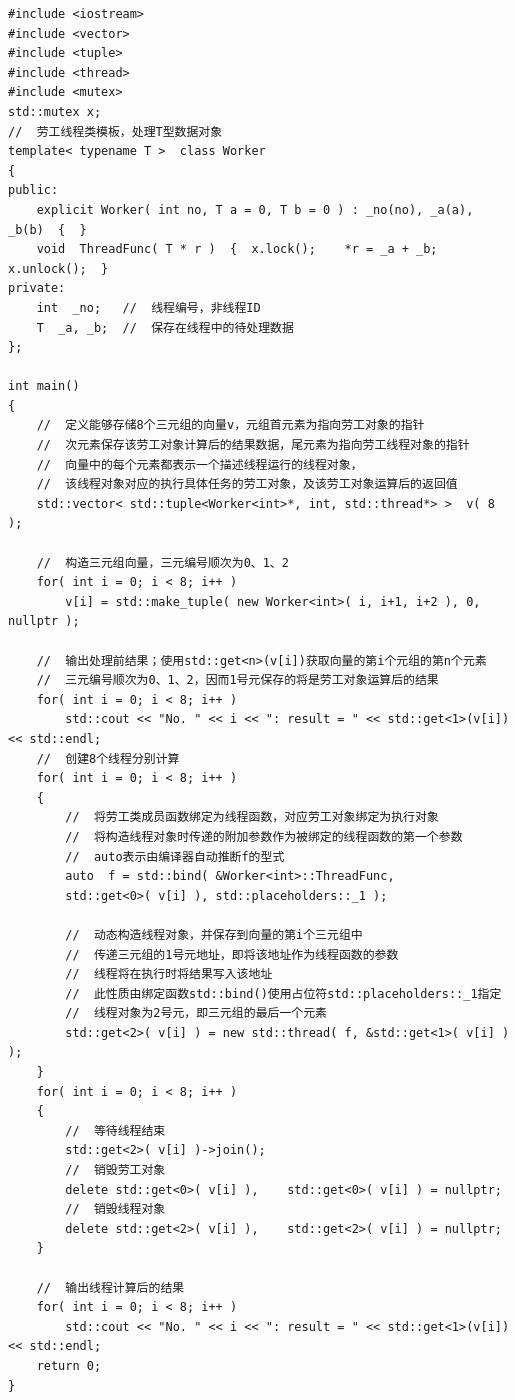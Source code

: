 \documentclass[UTF8,a4paper,12pt]{ctexbook}
\begin{document}
			\begin{lstlisting}
#include <iostream>
#include <vector>
#include <tuple>
#include <thread>
#include <mutex>
std::mutex x;
//  劳工线程类模板，处理T型数据对象
template< typename T >  class Worker
{
public:
	explicit Worker( int no, T a = 0, T b = 0 ) : _no(no), _a(a), _b(b)  {  }
	void  ThreadFunc( T * r )  {  x.lock();    *r = _a + _b;    x.unlock();  }
private:
	int  _no;	//  线程编号，非线程ID
	T  _a, _b;	//  保存在线程中的待处理数据
};
		
int main()
{
	//  定义能够存储8个三元组的向量v，元组首元素为指向劳工对象的指针
	//  次元素保存该劳工对象计算后的结果数据，尾元素为指向劳工线程对象的指针
	//  向量中的每个元素都表示一个描述线程运行的线程对象，
	//  该线程对象对应的执行具体任务的劳工对象，及该劳工对象运算后的返回值
	std::vector< std::tuple<Worker<int>*, int, std::thread*> >  v( 8 );
			
	//  构造三元组向量，三元编号顺次为0、1、2
	for( int i = 0; i < 8; i++ )
		v[i] = std::make_tuple( new Worker<int>( i, i+1, i+2 ), 0, nullptr );
			
	//  输出处理前结果；使用std::get<n>(v[i])获取向量的第i个元组的第n个元素
	//  三元编号顺次为0、1、2，因而1号元保存的将是劳工对象运算后的结果
	for( int i = 0; i < 8; i++ )
		std::cout << "No. " << i << ": result = " << std::get<1>(v[i]) << std::endl;
	//  创建8个线程分别计算
	for( int i = 0; i < 8; i++ )
	{
		//  将劳工类成员函数绑定为线程函数，对应劳工对象绑定为执行对象
		//  将构造线程对象时传递的附加参数作为被绑定的线程函数的第一个参数
		//  auto表示由编译器自动推断f的型式
		auto  f = std::bind( &Worker<int>::ThreadFunc,
		std::get<0>( v[i] ), std::placeholders::_1 );
				
		//  动态构造线程对象，并保存到向量的第i个三元组中
		//  传递三元组的1号元地址，即将该地址作为线程函数的参数
		//  线程将在执行时将结果写入该地址
		//  此性质由绑定函数std::bind()使用占位符std::placeholders::_1指定
		//  线程对象为2号元，即三元组的最后一个元素
		std::get<2>( v[i] ) = new std::thread( f, &std::get<1>( v[i] ) );
	}
	for( int i = 0; i < 8; i++ )
	{
		//  等待线程结束
		std::get<2>( v[i] )->join(); 
		//  销毁劳工对象
		delete std::get<0>( v[i] ),    std::get<0>( v[i] ) = nullptr;
		//  销毁线程对象
		delete std::get<2>( v[i] ),    std::get<2>( v[i] ) = nullptr;
	}
			
	//  输出线程计算后的结果
	for( int i = 0; i < 8; i++ )
		std::cout << "No. " << i << ": result = " << std::get<1>(v[i]) << std::endl;
	return 0;
}	   				
			\end{lstlisting}
				
\end{document}
